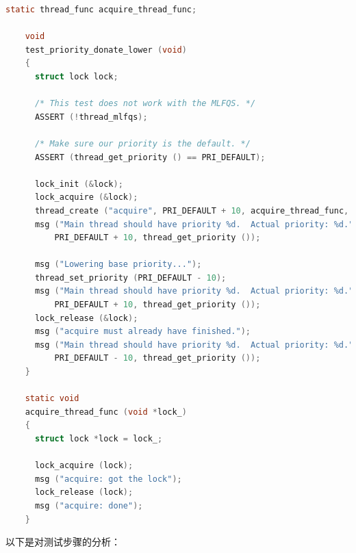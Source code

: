 \documentclass{article}
\begin{document}
\begin{lstlisting}[language=C, title=\texttt{priority-donate-lower}测试]
    static thread_func acquire_thread_func;

    void
    test_priority_donate_lower (void) 
    {
      struct lock lock;
    
      /* This test does not work with the MLFQS. */
      ASSERT (!thread_mlfqs);
    
      /* Make sure our priority is the default. */
      ASSERT (thread_get_priority () == PRI_DEFAULT);
    
      lock_init (&lock);
      lock_acquire (&lock);
      thread_create ("acquire", PRI_DEFAULT + 10, acquire_thread_func, &lock);
      msg ("Main thread should have priority %d.  Actual priority: %d.",
          PRI_DEFAULT + 10, thread_get_priority ());
    
      msg ("Lowering base priority...");
      thread_set_priority (PRI_DEFAULT - 10);
      msg ("Main thread should have priority %d.  Actual priority: %d.",
          PRI_DEFAULT + 10, thread_get_priority ());
      lock_release (&lock);
      msg ("acquire must already have finished.");
      msg ("Main thread should have priority %d.  Actual priority: %d.",
          PRI_DEFAULT - 10, thread_get_priority ());
    }
    
    static void
    acquire_thread_func (void *lock_) 
    {
      struct lock *lock = lock_;
    
      lock_acquire (lock);
      msg ("acquire: got the lock");
      lock_release (lock);
      msg ("acquire: done");
    }
\end{lstlisting}

以下是对测试步骤的分析：
\end{document}
